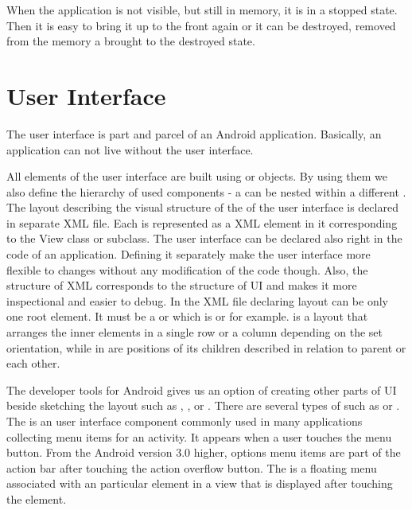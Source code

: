 When the application is not visible, but still in memory, it is in a stopped state.
Then it is easy to bring it up to the front again or it can be destroyed, removed from the memory a brought to the destroyed state.




\section{User Interface}
\label{sec:ui}

The user interface is part and parcel of an Android application.
Basically, an application can not live without the user interface.

All elements of the user interface are built using  or  objects.
By using them we also define the hierarchy of used components - a  can be nested within a different .
The layout describing the visual structure of the  of the user interface is declared in separate XML file.
Each  is represented as a XML element in it corresponding to the View class or subclass.
The user interface can be declared also right in the code of an application. 
Defining it separately make the user interface more flexible to changes without any modification of the code though.
Also, the structure of XML corresponds to the structure of UI and makes it more inspectional and easier to debug.
In the XML file declaring layout can be only one root element. 
It must be a  or  which is  or  for example.
 is a layout that arranges the inner elements in a single row or a column depending on the set orientation, 
while in  are positions of its children described in relation to parent or each other.

The developer tools for Android gives us an option of creating other parts of UI beside sketching the layout such as , ,  or .
There are several types of  such as  or .
The  is an user interface component commonly used in many applications collecting menu items for an activity.
It appears when a user touches the menu button.
From the Android version 3\@.0 higher, options menu items are part of the action bar after touching the action overflow button.
The  is a floating menu associated with an particular element in a view that is displayed after touching the element.

